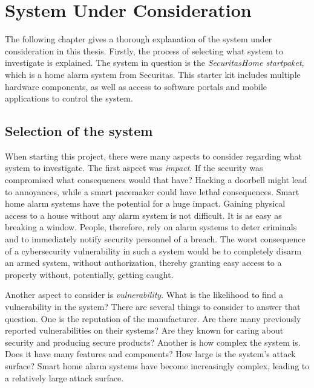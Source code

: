 \chapter{System Under Consideration} \label{ch:system}
The following chapter gives a thorough explanation of the system under consideration in this thesis. Firstly, the process of selecting what system to investigate is explained. The system in question is the \textit{SecuritasHome startpaket}, which is a home alarm system from Securitas. This starter kit includes multiple hardware components, as well as access to software portals and mobile applications to control the system.

\section{Selection of the system} \label{ch:system:selection}
When starting this project, there were many aspects to consider regarding what system to investigate. The first aspect was \textit{impact}. If the security was compromised what consequences would that have? Hacking a doorbell might lead to annoyances, while a smart pacemaker could have lethal consequences. Smart home alarm systems have the potential for a huge impact. Gaining physical access to a house without any alarm system is not difficult. It is as easy as breaking a window. People, therefore, rely on alarm systems to deter criminals and to immediately notify security personnel of a breach. The worst consequence of a cybersecurity vulnerability in such a system would be to completely disarm an armed system, without authorization, thereby granting easy access to a property without, potentially, getting caught.

Another aspect to consider is \textit{vulnerability}. What is the likelihood to find a vulnerability in the system? There are several things to consider to answer that question. One is the reputation of the manufacturer. Are there many previously reported vulnerabilities on their systems? Are they known for caring about security and producing secure products? Another is how complex the system is. Does it have many features and components? How large is the system's attack surface? Smart home alarm systems have become increasingly complex, leading to a relatively large attack surface.

